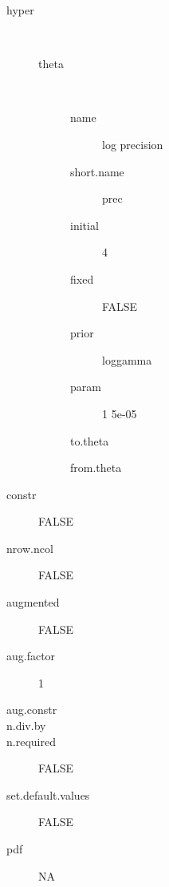 \begin{description}
	\item[hyper]\ 
	 \begin{description}
	 	\item[theta]\ 
	 	 \begin{description}
	 	 	 \item[ name ] log precision 
	 	 	 \item[ short.name ] prec 
	 	 	 \item[ initial ] 4 
	 	 	 \item[ fixed ] FALSE 
	 	 	 \item[ prior ] loggamma 
	 	 	 \item[ param ] 1 5e-05 
	 	 	 \item[ to.theta ] \verb|| 
	 	 	 \item[ from.theta ] \verb|| 
	 	 \end{description}
	 \end{description}
	 \item[ constr ] FALSE 
	 \item[ nrow.ncol ] FALSE 
	 \item[ augmented ] FALSE 
	 \item[ aug.factor ] 1 
	 \item[ aug.constr ]  
	 \item[ n.div.by ]  
	 \item[ n.required ] FALSE 
	 \item[ set.default.values ] FALSE 
	 \item[ pdf ] NA 
\end{description}
